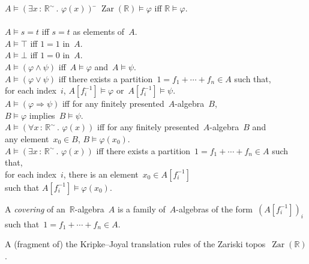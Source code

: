 \documentclass[oneside,reqno]{amsart}
\theoremstyle{definition}
\theoremstyle{plain}
\theoremstyle{remark}
\newcommand{\RR}{\mathbb{R}}
\DeclareMathOperator{\Zar}{Zar}
\renewcommand{\_}{\mathpunct{.}\,}
\newcommand{\?}{\,{:}\,}
\begin{document}
\begin{table}
  \begin{framed}
    \begin{tabbing}
      $A \models (\exists x\?\RR^\sim\_ \varphi(x))$ \= \kill
      $\Zar(\RR) \models \varphi$ \> iff $\RR \models \varphi$. \\\\
      $A \models s = t$ \> iff $s = t$ as elements of~$A$. \\
      $A \models \top$ \> iff $1 = 1$ in~$A$. \\
      $A \models \bot$ \> iff $1 = 0$ in~$A$. \\
      $A \models (\varphi \wedge \psi)$ \> iff~$A \models \varphi$ and~$A \models \psi$. \\
      $A \models (\varphi \vee \psi)$ \> iff there exists a partition~$1 = f_1 + \cdots + f_n \in A$ such that, \\
      \> \qquad for each index~$i$, $A[f_i^{-1}] \models \varphi$ or~$A[f_i^{-1}] \models \psi$. \\
      $A \models (\varphi \Rightarrow \psi)$ \> iff for any finitely
      presented~$A$-algebra~$B$, \\
      \> \qquad $B \models \varphi$ implies~$B \models \psi$. \\
      $A \models (\forall x\?\RR^\sim\_ \varphi(x))$ \> iff for any finitely
      presented~$A$-algebra~$B$ and \\
      \> \qquad any element~$x_0 \in B$, $B \models \varphi(x_0)$. \\
      $A \models (\exists x\?\RR^\sim\_ \varphi(x))$ \> iff there exists a partition~$1 = f_1 + \cdots + f_n \in A$ such that, \\
      \> \qquad for each index~$i$, there is an element~$x_0 \in A[f_i^{-1}]$ \\
      \> \qquad such that $A[f_i^{-1}] \models \varphi(x_0)$.
    \end{tabbing}

    \bigskip
    \justify
    A \emph{covering} of an~$\RR$-algebra~$A$ is a family of~$A$-algebras of the
    form~$(A[f_i^{-1}])_i$ such that~$1 = f_1 + \cdots + f_n \in A$.
  \end{framed}
  \bigskip

  \caption{\label{table:zariski} A (fragment of) the Kripke--Joyal translation
  rules of the Zariski topos~$\Zar(\RR)$.}
\end{table}
\end{document}
